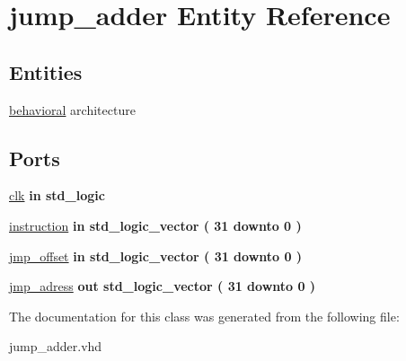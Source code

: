 \hypertarget{classjump__adder}{\section{jump\-\_\-adder \-Entity \-Reference}
\label{classjump__adder}
}
\subsection*{\-Entities}
\begin{DoxyCompactItemize}
\item 
\hyperlink{classjump__adder_1_1behavioral}{behavioral} architecture
\end{DoxyCompactItemize}
\*
\*
\subsection*{\-Ports}
 \begin{DoxyCompactItemize}
\item 
\hypertarget{classjump__adder_af860a3a86b5cfd289a189d1220f4648d}{\hyperlink{classjump__adder_af860a3a86b5cfd289a189d1220f4648d}{clk}  {\bfseries {\bfseries in }} {\bfseries std\-\_\-logic } }\label{classjump__adder_af860a3a86b5cfd289a189d1220f4648d}

\item 
\hypertarget{classjump__adder_a298266092b29f7f7afb088eecb4e46c1}{\hyperlink{classjump__adder_a298266092b29f7f7afb088eecb4e46c1}{instruction}  {\bfseries {\bfseries in }} {\bfseries std\-\_\-logic\-\_\-vector (   31    downto    0  ) } }\label{classjump__adder_a298266092b29f7f7afb088eecb4e46c1}

\item 
\hypertarget{classjump__adder_a83702b6a2e8dc32a0ac5cfe7e8cafd61}{\hyperlink{classjump__adder_a83702b6a2e8dc32a0ac5cfe7e8cafd61}{jmp\-\_\-offset}  {\bfseries {\bfseries in }} {\bfseries std\-\_\-logic\-\_\-vector (   31    downto    0  ) } }\label{classjump__adder_a83702b6a2e8dc32a0ac5cfe7e8cafd61}

\item 
\hypertarget{classjump__adder_ad176de343f2a06617f92deabbbbf6256}{\hyperlink{classjump__adder_ad176de343f2a06617f92deabbbbf6256}{jmp\-\_\-adress}  {\bfseries {\bfseries out }} {\bfseries std\-\_\-logic\-\_\-vector (   31    downto    0  ) } }\label{classjump__adder_ad176de343f2a06617f92deabbbbf6256}

\end{DoxyCompactItemize}


\-The documentation for this class was generated from the following file\-:\begin{DoxyCompactItemize}
\item 
jump\-\_\-adder.\-vhd\end{DoxyCompactItemize}
